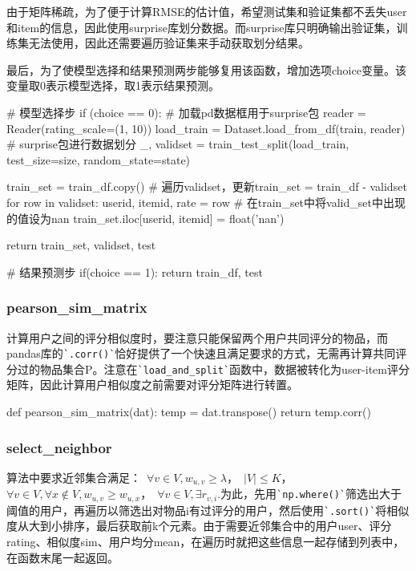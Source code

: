 \documentclass[12pt, a4paper]{ctexart}
\begin{document}
由于矩阵稀疏，为了便于计算RMSE的估计值，希望测试集和验证集都不丢失user和item的信息，因此使用surprise库划分数据。而surprise库只明确输出验证集，训练集无法使用，因此还需要遍历验证集来手动获取划分结果。

最后，为了使模型选择和结果预测两步能够复用该函数，增加选项choice变量。该变量取0表示模型选择，取1表示结果预测。

\begin{python}
  # 模型选择步
  if (choice == 0):
    # 加载pd数据框用于surprise包
    reader = Reader(rating_scale=(1, 10))
    load_train = Dataset.load_from_df(train, reader)
    # surprise包进行数据划分
    _, validset = train_test_split(load_train, test_size=size, random_state=state)

    train_set = train_df.copy()
    # 遍历validset，更新train_set = train_df - validset
    for row in validset:
        userid, itemid, rate = row
        # 在train_set中将valid_set中出现的值设为nan
        train_set.iloc[userid, itemid] = float('nan')
    
    return train_set, validset, test
    
  # 结果预测步
  if(choice == 1):
     return train_df, test
\end{python}


\subsubsection{pearson\_sim\_matrix}

计算用户之间的评分相似度时，要注意只能保留两个用户共同评分的物品，而pandas库的\verb|`.corr()`|恰好提供了一个快速且满足要求的方式，无需再计算共同评分过的物品集合P。注意在\verb|`load_and_split`|函数中，数据被转化为user-item评分矩阵，因此计算用户相似度之前需要对评分矩阵进行转置。

\begin{python}
def pearson_sim_matrix(dat):
  temp = dat.transpose()
  return temp.corr()
\end{python}


\subsubsection{select\_neighbor}

算法中要求近邻集合满足：\ $\forall v \in V,w_{u,v}\geq \lambda$，\ $\lvert V\lvert\leq K$，\ $\forall v \in V,\forall x \not\in V, w_{u,v}\geq w_{u,x}$，\ $\forall v \in V,\exists r_{v,i}$.为此，先用\verb|`np.where()`|筛选出大于阈值的用户，再遍历以筛选出对物品i有过评分的用户，然后使用\verb|`.sort()`|将相似度从大到小排序，最后获取前k个元素。由于需要近邻集合中的用户user、评分rating、相似度sim、用户均分mean，在遍历时就把这些信息一起存储到列表中，在函数末尾一起返回。
\end{document}
